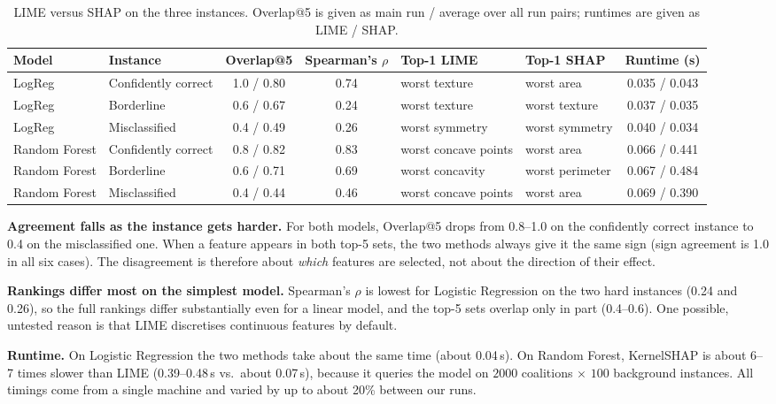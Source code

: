 \documentclass[11pt,a4paper]{article}
\begin{document}
\begin{table}[!htb]
\centering\footnotesize
\caption{LIME versus SHAP on the three instances. Overlap@5 is given as main
run / average over all run pairs; runtimes are given as LIME / SHAP.}\label{tab:compare}
\setlength{\tabcolsep}{3pt}
\begin{tabular}{@{}L{1.9cm}L{2.2cm}ccL{2.3cm}L{2.3cm}c@{}}
\toprule
\textbf{Model} & \textbf{Instance} & \textbf{Overlap@5} & \textbf{Spearman's $\rho$} & \textbf{Top-1 LIME} & \textbf{Top-1 SHAP} & \textbf{Runtime (s)}\\
\midrule
LogReg & Confidently correct & 1.0 / 0.80 & 0.74 & worst texture & worst area & 0.035 / 0.043\\
LogReg & Borderline & 0.6 / 0.67 & 0.24 & worst texture & worst texture & 0.037 / 0.035\\
LogReg & Misclassified & 0.4 / 0.49 & 0.26 & worst symmetry & worst symmetry & 0.040 / 0.034\\
Random Forest & Confidently correct & 0.8 / 0.82 & 0.83 & worst concave points & worst area & 0.066 / 0.441\\
Random Forest & Borderline & 0.6 / 0.71 & 0.69 & worst concavity & worst perimeter & 0.067 / 0.484\\
Random Forest & Misclassified & 0.4 / 0.44 & 0.46 & worst concave points & worst area & 0.069 / 0.390\\
\bottomrule
\end{tabular}
\end{table}

\textbf{Agreement falls as the instance gets harder.} For both models,
Overlap@5 drops from 0.8--1.0 on the confidently correct instance to 0.4 on
the misclassified one. When a feature appears in both top-5 sets, the two
methods always give it the same sign (sign agreement is 1.0 in all six cases).
The disagreement is therefore about \emph{which} features are selected, not
about the direction of their effect.

\textbf{Rankings differ most on the simplest model.} Spearman's $\rho$ is
lowest for Logistic Regression on the two hard instances (0.24 and 0.26), so
the full rankings differ substantially even for a linear model, and the top-5
sets overlap only in part (0.4--0.6). One possible, untested reason is that
LIME discretises continuous features by default.

\textbf{Runtime.} On Logistic Regression the two methods take about the same
time (about 0.04\,s). On Random Forest, KernelSHAP is about 6--7 times slower
than LIME (0.39--0.48\,s vs.\ about 0.07\,s), because it queries the model on
$2000$ coalitions $\times$ $100$ background instances. All timings come from a
single machine and varied by up to about 20\% between our runs.
\end{document}
